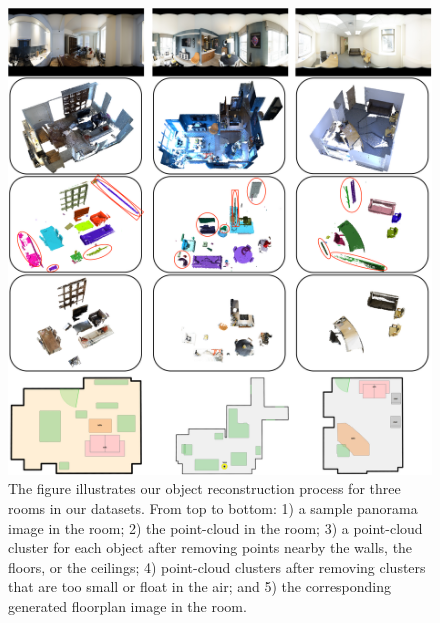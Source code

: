 \clearpage
\begin{figure}[!t]
  \centering
  \includegraphics[width=\textwidth]{../figures/object_reconstruction.png}
  \caption{The figure illustrates our object reconstruction process for
  three rooms in our datasets.  From top to bottom: 1) a sample panorama
  image in the room; 2) the point-cloud in the room; 3) a point-cloud
  cluster for each object after removing points nearby the walls, the
  floors, or the ceilings; 4) point-cloud clusters after removing
  clusters that are too small or float in the air; and 5) the
 corresponding generated floorplan image in the room.
 }
 \label{fig:objectreconstruction}
\end{figure}

